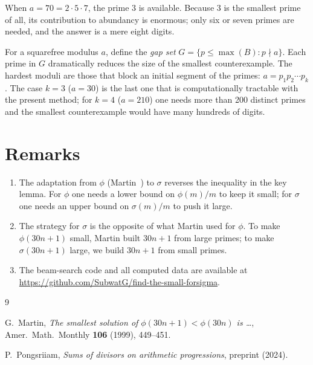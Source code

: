 \documentclass[12pt]{amsart}
\theoremstyle{definition}
\begin{document}
When $a = 70 = 2\cdot5\cdot7$, the prime $3$ is available.  Because $3$ is the
smallest prime of all, its contribution to abundancy is enormous; only six or
seven primes are needed, and the answer is a mere eight digits.

For a squarefree modulus $a$, define the \emph{gap set}
$G = \{p \le \max(B) : p \nmid a\}$.  Each prime in $G$ dramatically reduces
the size of the smallest counterexample.  The hardest moduli are those that
block an initial segment of the primes: $a = p_1 p_2 \cdots p_k$.
The case $k=3$ ($a=30$) is the last one that is computationally tractable with
the present method; for $k=4$ ($a=210$) one needs more than 200 distinct primes
and the smallest counterexample would have many hundreds of digits.

\section{Remarks}

\begin{enumerate}
  \item The adaptation from $\phi$ (Martin~\cite{martin}) to $\sigma$ reverses
        the inequality in the key lemma.  For $\phi$ one needs a lower bound on
        $\phi(m)/m$ to keep it small; for $\sigma$ one needs an upper bound on
        $\sigma(m)/m$ to push it large.

  \item The strategy for $\sigma$ is the opposite of what Martin used for
        $\phi$.  To make $\phi(30n+1)$ small, Martin built $30n+1$ from large
        primes; to make $\sigma(30n+1)$ large, we build $30n+1$ from small
        primes.

  \item The beam-search code and all computed data are available at
        \url{https://github.com/SubwatG/find-the-small-forsigma}.
\end{enumerate}

\begin{thebibliography}{9}

G.~Martin, \emph{The smallest solution of $\phi(30n+1) < \phi(30n)$ is \dots},
Amer.\ Math.\ Monthly \textbf{106} (1999), 449--451.

P.~Pongsriiam, \emph{Sums of divisors on arithmetic progressions},
preprint (2024).

\end{thebibliography}
\end{document}
